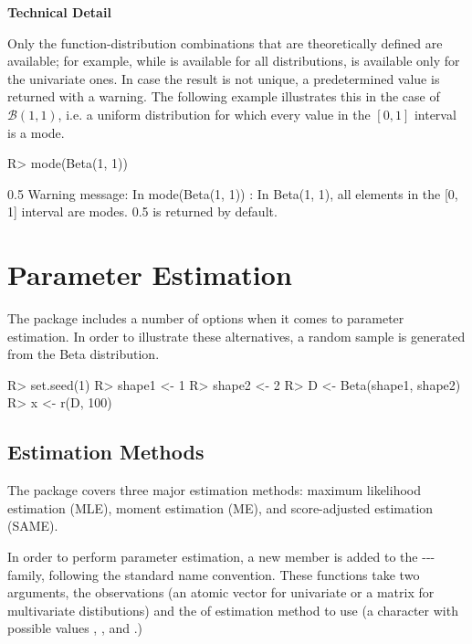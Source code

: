 \documentclass[nojss]{jss}
\newcommand{\fct}[1]{\code{#1()}}
\begin{document}
\begin{leftbar}
\textbf{Technical Detail}

Only the function-distribution combinations that are theoretically defined are available; for example, while \fct{var} is available for all distributions, \fct{sd} is available only for the univariate ones. In case the result is not unique, a predetermined value is returned with a warning. The following example illustrates this in the case of $\mathcal{B}(1, 1)$, i.e. a uniform distribution for which every value in the $[0, 1]$ interval is a mode.

\begin{CodeChunk}
\begin{CodeInput}
R> mode(Beta(1, 1))
\end{CodeInput}
\begin{CodeOutput}
[1] 0.5
Warning message:
In mode(Beta(1, 1)) :
  In Beta(1, 1), all elements in the [0, 1] interval are modes.
  0.5 is returned by default.
\end{CodeOutput}
\end{CodeChunk}

\end{leftbar}

\section[Parameter Estimation]{Parameter Estimation} \label{s:estim}

The  package includes a number of options when it comes to parameter estimation. In order to illustrate these alternatives, a random sample is generated from the Beta distribution.

\begin{Schunk}
\begin{Sinput}
R> set.seed(1)
R> shape1 <- 1
R> shape2 <- 2
R> D <- Beta(shape1, shape2)
R> x <- r(D, 100)
\end{Sinput}
\end{Schunk}

\subsection[Estimation Methods]{Estimation Methods}\label{ss:estim-methods}

The  package covers three major estimation methods: maximum likelihood estimation (MLE), moment estimation (ME), and score-adjusted estimation (SAME).

In order to perform parameter estimation, a new \fct{e<name>} member is added to the \fct{d}-\fct{p}-\fct{q}-\fct{r} family, following the standard  name convention. These \fct{e<name>} functions take two arguments, the observations  (an atomic vector for univariate or a matrix for multivariate distibutions) and the  of estimation method to use (a character with possible values , , and .)
\end{document}
